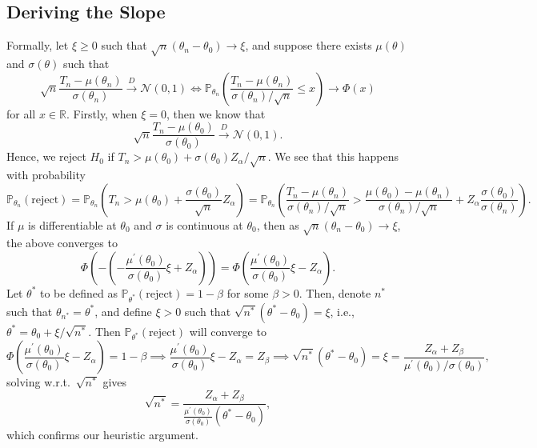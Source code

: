 \subsection{Deriving the Slope}
Formally, let \(\xi \geq 0\) such that \(\sqrt{n} (\theta _n - \theta _0) \to \xi \), and suppose there exists \(\mu (\theta )\) and \(\sigma (\theta )\) such that
\[
	\sqrt{n} \frac{T_n - \mu (\theta _n)}{\sigma (\theta _n)}
	\overset{D}{\to} \mathcal{N} (0, 1)
	\iff
	\mathbb{P} _{\theta _n} \left( \frac{T_n - \mu (\theta _n)}{\sigma (\theta _n) / \sqrt{n} } \leq x \right)
	\to \Phi (x)
\]
for all \(x \in \mathbb{R} \). Firstly, when \(\xi = 0\), then we know that
\[
	\sqrt{n} \frac{T_n - \mu (\theta _0)}{\sigma (\theta _0)}
	\overset{D}{\to} \mathcal{N} (0, 1).
\]
Hence, we reject \(H_0\) if \(T_n > \mu (\theta _0) + \sigma (\theta _0) Z_\alpha / \sqrt{n} \). We see that this happens with probability
\[
	\mathbb{P} _{\theta _n}(\text{reject} )
	= \mathbb{P} _{\theta _n} \left( T_n > \mu (\theta _0) + \frac{\sigma (\theta _0)}{\sqrt{n} } Z_\alpha \right)
	= \mathbb{P} _{\theta _n} \left( \frac{T_n - \mu (\theta _n)}{\sigma (\theta _n) / \sqrt{n} } > \frac{\mu (\theta _0) - \mu (\theta _n)}{\sigma (\theta _n) / \sqrt{n} } + Z_\alpha \frac{\sigma (\theta _0)}{\sigma (\theta _n)} \right).
\]
If \(\mu \) is differentiable at \(\theta _0\) and \(\sigma \) is continuous at \(\theta _0\), then as \(\sqrt{n} (\theta _n - \theta _0) \to \xi\), the above converges to
\[
	\Phi \left( - \left( - \frac{\mu ^{\prime} (\theta _0)}{\sigma (\theta _0)}\xi + Z_\alpha \right) \right)
	= \Phi \left( \frac{\mu ^{\prime} (\theta _0)}{\sigma (\theta _0)}\xi - Z_\alpha \right).
\]
Let \(\theta ^{\ast} \) to be defined as \(\mathbb{P} _{\theta ^{\ast} }(\text{reject} ) = 1 - \beta \) for some \(\beta > 0\). Then, denote \(n^{\ast} \) such that \(\theta _{n^{\ast} } = \theta ^{\ast} \), and define \(\xi > 0\) such that \(\sqrt{n^{\ast} } (\theta ^{\ast} - \theta _0) = \xi\), i.e., \(\theta ^{\ast} = \theta _0 + \xi / \sqrt{n^{\ast} } \). Then \(\mathbb{P} _{\theta ^{\ast} }(\text{reject} )\) will converge to
\[
	\Phi \left( \frac{\mu ^{\prime} (\theta _0)}{\sigma (\theta _0)}\xi - Z_\alpha \right)
	= 1 - \beta
	\implies \frac{\mu ^{\prime} (\theta _0)}{\sigma (\theta _0)}\xi - Z_\alpha
	= Z_\beta
	\implies \sqrt{n^{\ast} }(\theta ^{\ast} - \theta _0)
	= \xi = \frac{Z_\alpha + Z_\beta }{\mu ^{\prime} (\theta _0) / \sigma (\theta _0)},
\]
solving w.r.t.\ \(\sqrt{n^{\ast} } \) gives
\[
	\sqrt{n^{\ast} }
	= \frac{Z_\alpha + Z_\beta }{\frac{\mu ^{\prime} (\theta _0)}{\sigma (\theta _0)} (\theta ^{\ast} - \theta _0)},
\]
which confirms our heuristic argument.

